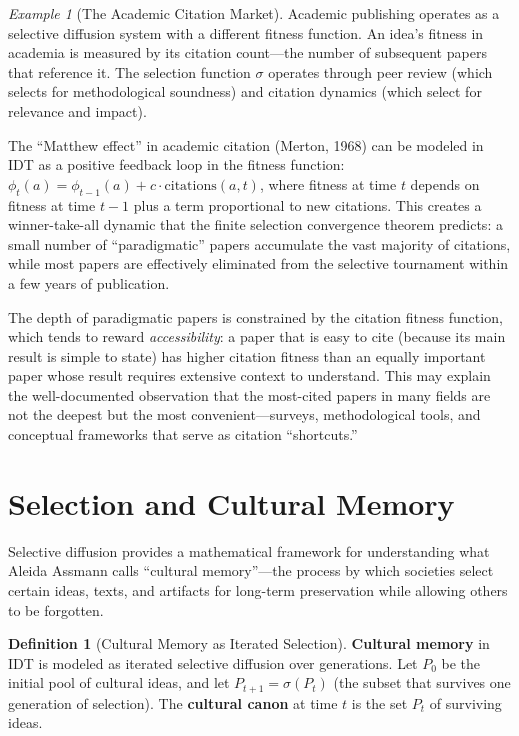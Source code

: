 \documentclass[11pt,openany]{book}
\theoremstyle{definition}
\newtheorem{definition}[axiom]{Definition}
\theoremstyle{plain}
\theoremstyle{remark}
\newtheorem{example}[axiom]{Example}
\begin{document}
\begin{example}[The Academic Citation Market]
Academic publishing operates as a selective diffusion system with a different fitness function. An idea's fitness in academia is measured by its citation count---the number of subsequent papers that reference it. The selection function $\sigma$ operates through peer review (which selects for methodological soundness) and citation dynamics (which select for relevance and impact).

The ``Matthew effect'' in academic citation (Merton, 1968) can be modeled in IDT as a positive feedback loop in the fitness function: $\phi_t(a) = \phi_{t-1}(a) + c \cdot \mathrm{citations}(a, t)$, where fitness at time $t$ depends on fitness at time $t-1$ plus a term proportional to new citations. This creates a winner-take-all dynamic that the finite selection convergence theorem predicts: a small number of ``paradigmatic'' papers accumulate the vast majority of citations, while most papers are effectively eliminated from the selective tournament within a few years of publication.

The depth of paradigmatic papers is constrained by the citation fitness function, which tends to reward \emph{accessibility}: a paper that is easy to cite (because its main result is simple to state) has higher citation fitness than an equally important paper whose result requires extensive context to understand. This may explain the well-documented observation that the most-cited papers in many fields are not the deepest but the most convenient---surveys, methodological tools, and conceptual frameworks that serve as citation ``shortcuts.''
\end{example}

\section{Selection and Cultural Memory}

Selective diffusion provides a mathematical framework for understanding what Aleida Assmann calls ``cultural memory''---the process by which societies select certain ideas, texts, and artifacts for long-term preservation while allowing others to be forgotten.

\begin{definition}[Cultural Memory as Iterated Selection]
\textbf{Cultural memory} in IDT is modeled as iterated selective diffusion over generations. Let $P_0$ be the initial pool of cultural ideas, and let $P_{t+1} = \sigma(P_t)$ (the subset that survives one generation of selection). The \textbf{cultural canon} at time $t$ is the set $P_t$ of surviving ideas.
\end{definition}
\end{document}
